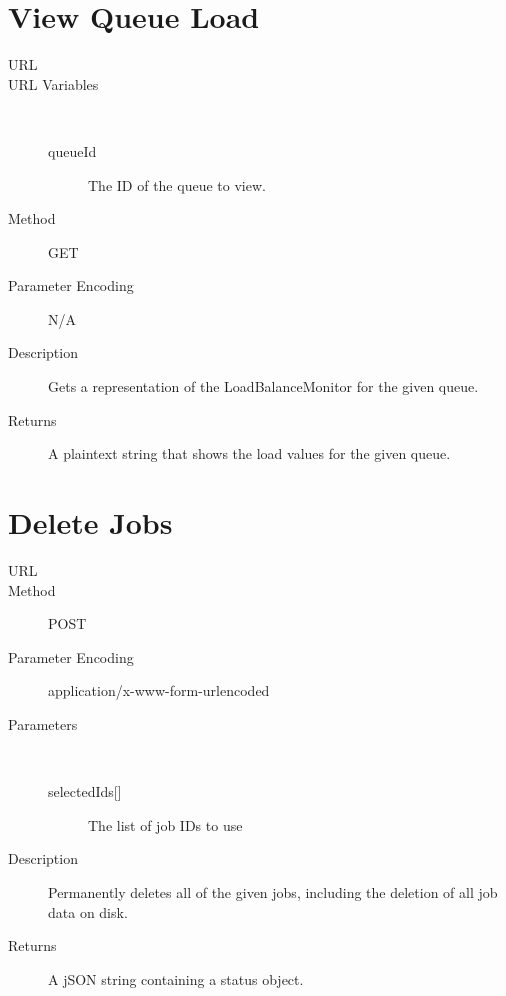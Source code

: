 \section{View Queue Load}
\begin{description}
\item [URL] 
\item [URL Variables] \
	\begin{description}
	\item [queueId]  The ID of the queue to view.
	\end{description}
\item [Method] GET
\item [Parameter Encoding] N/A
\item [Description] Gets a representation of the LoadBalanceMonitor for the given queue.
\item [Returns] A plaintext string that shows the load values for the given queue.
\end{description}


\section{Delete Jobs}
\begin{description}
\item [URL] 
\item [Method] POST
\item [Parameter Encoding] application/x-www-form-urlencoded
\item [Parameters] \
	\begin{description}
	\item [{selectedIds[]}]  The list of job IDs to use
	\end{description}
\item [Description] Permanently deletes all of the given jobs, including the deletion of all job data on disk.
\item [Returns] A jSON string containing a status object.
\end{description}
